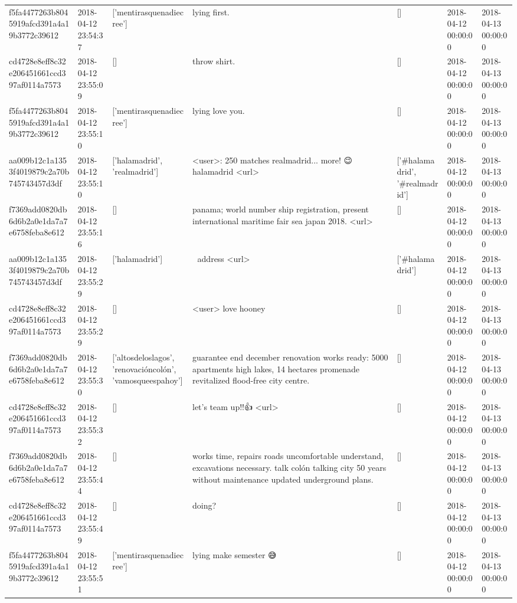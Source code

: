 \begin{tabular}{lllllll}
f5fa4477263b8045919afcd391a4a19b3772c39612 & 2018-04-12 23:54:37 & ['mentirasquenadiecree'] & lying first. & [] & 2018-04-12 00:00:00 & 2018-04-13 00:00:00 \\
cd4728e8eff8c32e206451661ccd397af0114a7573 & 2018-04-12 23:55:09 & [] & throw shirt. & [] & 2018-04-12 00:00:00 & 2018-04-13 00:00:00 \\
f5fa4477263b8045919afcd391a4a19b3772c39612 & 2018-04-12 23:55:10 & ['mentirasquenadiecree'] & lying love you. & [] & 2018-04-12 00:00:00 & 2018-04-13 00:00:00 \\
aa009b12c1a1353f4019879c2a70b745743457d3df & 2018-04-12 23:55:10 & ['halamadrid', 'realmadrid'] & <user>: 250 matches realmadrid... more! 😉 halamadrid <url> & ['#halamadrid', '#realmadrid'] & 2018-04-12 00:00:00 & 2018-04-13 00:00:00 \\
f7369add0820db6d6b2a0e1da7a7e6758feba8e612 & 2018-04-12 23:55:16 & [] & panama; world number ship registration, present international maritime fair sea japan 2018. <url> & [] & 2018-04-12 00:00:00 & 2018-04-13 00:00:00 \\
aa009b12c1a1353f4019879c2a70b745743457d3df & 2018-04-12 23:55:29 & ['halamadrid'] & 💪 address <url> & ['#halamadrid'] & 2018-04-12 00:00:00 & 2018-04-13 00:00:00 \\
cd4728e8eff8c32e206451661ccd397af0114a7573 & 2018-04-12 23:55:29 & [] & <user> love hooney & [] & 2018-04-12 00:00:00 & 2018-04-13 00:00:00 \\
f7369add0820db6d6b2a0e1da7a7e6758feba8e612 & 2018-04-12 23:55:30 & ['altosdeloslagos', 'renovacióncolón', 'vamosqueespahoy'] & guarantee end december renovation works ready: 5000 apartments high lakes, 14 hectares promenade revitalized flood-free city centre. & [] & 2018-04-12 00:00:00 & 2018-04-13 00:00:00 \\
cd4728e8eff8c32e206451661ccd397af0114a7573 & 2018-04-12 23:55:32 & [] & let's team up!!👍 <url> & [] & 2018-04-12 00:00:00 & 2018-04-13 00:00:00 \\
f7369add0820db6d6b2a0e1da7a7e6758feba8e612 & 2018-04-12 23:55:44 & [] & works time, repairs roads uncomfortable understand, excavations necessary. talk colón talking city 50 years without maintenance updated underground plans. & [] & 2018-04-12 00:00:00 & 2018-04-13 00:00:00 \\
cd4728e8eff8c32e206451661ccd397af0114a7573 & 2018-04-12 23:55:49 & [] & doing? & [] & 2018-04-12 00:00:00 & 2018-04-13 00:00:00 \\
f5fa4477263b8045919afcd391a4a19b3772c39612 & 2018-04-12 23:55:51 & ['mentirasquenadiecree'] & lying make semester 😅 & [] & 2018-04-12 00:00:00 & 2018-04-13 00:00:00 \\

\end{tabular}
